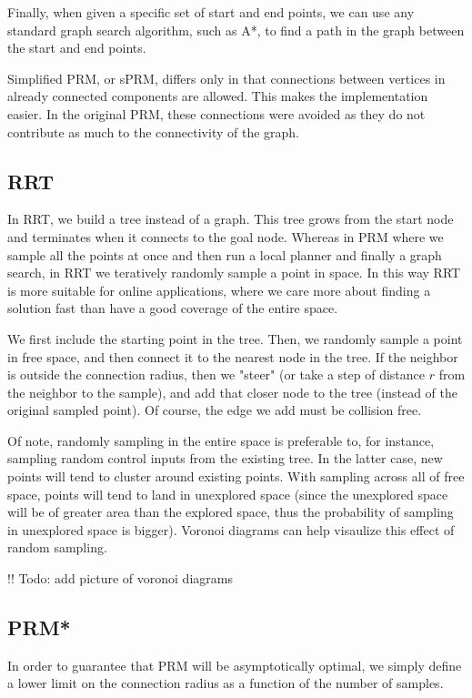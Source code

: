 \documentclass[a4paper]{article}
\begin{document}
Finally, when given a specific set of start and end points, we can use any
standard graph search algorithm, such as A*, to find a path in the graph between
the start and end points.

Simplified PRM, or sPRM, differs only in that connections between vertices in
already connected components are allowed. This makes the implementation easier.
In the original PRM, these connections were avoided as they do not contribute as
much to the connectivity of the graph.

\subsection{RRT}

In RRT, we build a tree instead of a graph. This tree grows from the start node
and terminates when it connects to the goal node. Whereas in PRM where we sample
all the points at once and then run a local planner and finally a graph search,
in RRT we teratively randomly sample a point in space. In this way RRT is more
suitable for online applications, where we care more about finding a solution
fast than have a good coverage of the entire space.

We first include the starting point in the tree. Then, we randomly sample a
point in free space, and then connect it to the nearest node in the tree. If the
neighbor is outside the connection radius, then we "steer" (or take a step of
distance $r$ from the neighbor to the sample), and add that closer node to the tree
(instead of the original sampled point). Of course, the edge we add must be
collision free. 

Of note, randomly sampling in the entire space is preferable to, for instance,
sampling random control inputs from the existing tree. In the latter case, new
points will tend to cluster around existing points. With sampling across all of
free space, points will tend to land in unexplored space (since the unexplored
space will be of greater area than the explored space, thus the probability of
sampling in unexplored space is bigger). Voronoi diagrams can help visaulize
this effect of random sampling. 

!! Todo: add picture of voronoi diagrams %

\subsection{PRM*}

In order to guarantee that PRM will be asymptotically optimal, we simply define
a lower limit on the connection radius as a function of the number of samples.
\end{document}
